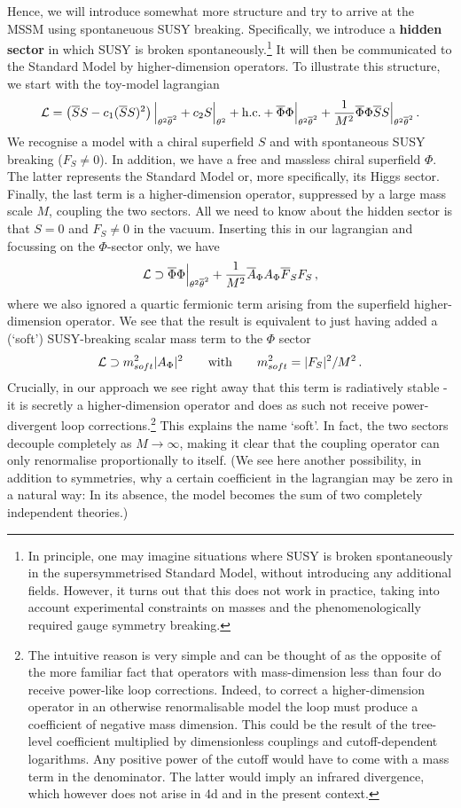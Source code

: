 \documentclass[12pt]{article}
\newcommand{\be}{\begin{equation}}
\newcommand{\ee}{\end{equation}}
\newcommand{\ol}{\overline}
\numberwithin{equation}{section}
\begin{document}
Hence, we will introduce somewhat more structure and try to arrive at the MSSM using spontaneuous SUSY breaking. Specifically, we introduce a {\bf hidden sector} in which SUSY is broken spontaneously.\footnote{
In 
principle, one may imagine situations where SUSY is broken spontaneously in the supersymmetrised Standard Model, without introducing any additional fields. However, it turns out that this does not work in practice, taking into account experimental constraints on masses and the phenomenologically required gauge symmetry breaking.
} 
It will then be communicated to the Standard Model by higher-dimension operators. To illustrate this structure, we start with the toy-model lagrangian
\be
{\cal L}=\left(\ol{S}S-c_1(\ol{S}S)^2\right)\Big|_{\theta^2\ol{\theta}^2}+c_2 S
\Big|_{\theta^2}+\mbox{h.c.}+\ol{\Phi}\Phi\Big|_{\theta^2\ol{\theta}^2}+ \frac{1}{M^2}\ol{\Phi}\Phi\ol{S}S\Big|_{\theta^2\ol{\theta}^2}\,.\label{tml}
\ee
We recognise a model with a chiral superfield $S$ and with spontaneous SUSY breaking ($F_S\neq 0$). In addition, we have a free and massless chiral superfield $\Phi$. The latter represents the Standard Model or, more specifically, its Higgs sector. Finally, the last term is a higher-dimension operator, suppressed by a large mass scale $M$, coupling the two sectors. All we need to know about the hidden sector is that $S=0$ and $F_S\neq 0$ in the vacuum. Inserting this in our lagrangian and focussing on the $\Phi$-sector only, we have
\be
{\cal L}\supset \ol{\Phi}\Phi\Big|_{\theta^2\ol{\theta}^2}+\frac{1}{M^2}\ol{A}_\Phi A_\Phi \ol{F}_SF_S\,,
\ee
where we also ignored a quartic fermionic term arising from the superfield higher-dimension operator. We see that the result is equivalent to just having added a (`soft') SUSY-breaking scalar mass term to the $\Phi$ sector
\be
{\cal L}\supset m_{soft}^2|A_\Phi|^2\qquad\mbox{with}\qquad m_{soft}^2=|F_S|^2/M^2\,.
\ee
Crucially, in our approach we see right away that this term is radiatively stable - it is secretly a higher-dimension operator and does as such not receive power-divergent loop corrections.\footnote{
The intuitive reason is very simple and can be thought of as the opposite of the more familiar fact that operators with mass-dimension less than four do receive power-like loop corrections. Indeed, to correct a higher-dimension operator in an otherwise renormalisable model the loop must produce a coefficient of negative mass dimension. This could be the result of the tree-level coefficient multiplied by dimensionless couplings and cutoff-dependent logarithms. Any positive power of the cutoff would have to come with a mass term in the denominator. The latter would imply an infrared divergence, which however does not arise in 4d and in the present context.
} 
This explains the name `soft'. In fact, the two sectors decouple completely as $M\to \infty$, making it clear that the coupling operator can only renormalise proportionally to itself. (We see here another possibility, in addition to symmetries, why a certain coefficient in the lagrangian may be zero in a natural way: In its absence, the model becomes the sum of two completely independent theories.)
\end{document}
